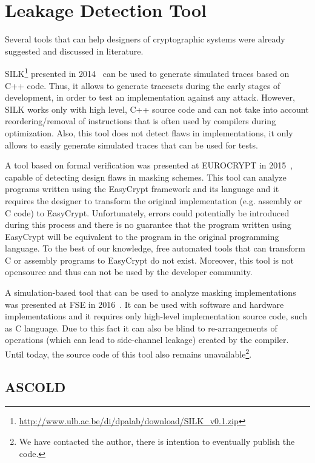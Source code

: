 \section{Leakage Detection Tool}\label{sec:tool}

Several tools that can help designers of cryptographic systems
were already suggested and discussed in literature.

SILK\footnote{\url{http://www.ulb.ac.be/di/dpalab/download/SILK_v0.1.zip}} 
presented in 2014~\cite{DBLP:conf/acsac/Veshchikov14}
can be used to generate simulated traces based on C++ code. Thus, it allows
to generate tracesets during the early stages of development, in order to test an implementation
against any attack. However, SILK works only with high level, C++  source code and 
can not take into account reordering/removal of instructions that is often used by compilers during
optimization. Also, this tool does not detect flaws in implementations, 
it only allows to easily generate simulated traces that can be used for tests.

A tool based on formal verification 
was presented at EUROCRYPT in 2015~\cite{DBLP:conf/eurocrypt/BartheBDFGS15},
capable of detecting design flaws in masking schemes.
This tool can analyze programs written using the EasyCrypt framework and its language and
it requires the designer to transform the original implementation (e.g. assembly or C code)
to EasyCrypt. Unfortunately, errors could potentially be introduced during this process
and there is no guarantee that the program written using EasyCrypt will be equivalent
to the program in the original programming language. To the best of our knowledge, 
free automated tools that can transform C or assembly programs to EasyCrypt do not exist.
Moreover, this tool is not opensource and thus can not be used by the developer community.

A simulation-based tool that can be used to analyze masking implementations
was presented at FSE in 2016~\cite{DBLP:conf/fse/Reparaz16}.
It can be used with software and hardware implementations
and it requires only high-level implementation source code, such as C language.
Due to this fact it can also be blind to re-arrangements of operations 
(which can lead to side-channel leakage) created by the compiler.
Until today, the source code of this tool also remains 
unavailable\footnote{We have contacted the author, there is intention to eventually publish the code.}.

\subsection{ASCOLD}\label{subsec:ascold}

